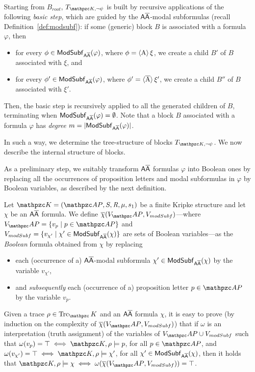 Starting from $B_{root}$,  $T_{\Ku,\neg\psi}$ is built by recursive applications of the following \emph{basic step}, 
which are guided
by the $\mathsf{A\overline{A}}$-modal subformulas (recall Definition~\ref{def:modsubf}):
%
if some (generic) block $B$ is associated with a formula $\varphi$, then
\begin{itemize}
	\item for every $\phi\in\mathsf{ModSubf}_{\mathsf{A\overline{A}}}(\varphi)$, where $\phi = \operatorname{\langle A\rangle} \xi$, we create a \forw{} child $B'$ of $B$ associated with $\xi$, and
	\item for every $\phi'\in\mathsf{ModSubf}_{\mathsf{A\overline{A}}}(\varphi)$, where $\phi' = \operatorname{\langle \overline{A}\rangle} \xi'$, we create a \back{} child $B''$ of $B$ associated with $\xi'$.
\end{itemize}
Then, the basic step is recursively applied to all the generated children of $B$, terminating when $\mathsf{ModSubf}_{\mathsf{A\overline{A}}}(\varphi)=\emptyset$.
Note that a block $B$ associated with a formula $\varphi$ has \emph{degree} $m=|\mathsf{ModSubf}_{\mathsf{A\overline{A}}}(\varphi)|$.

In such a way, we determine the 
tree-structure of blocks $T_{\Ku,\neg\psi}$. We now describe the internal structure of blocks. 

As a preliminary step, we suitably transform $\mathsf{A\overline{A}}$ formulas $\varphi$ into Boolean ones by replacing all the occurrences of proposition letters and modal subformulas in $\varphi$ by Boolean variables, as described by the next definition.

\begin{definition}\label{psioverl}
Let $\Ku=(\Prop,\States,\Edges,\Lab,s_1)$ be a finite Kripke structure and let $\chi$ be
an $\mathsf{A\overline{A}}$ formula. We define $\overline{\chi}(V_\Prop, V_{modSubf})$---where $V_\Prop=\{v_p\mid p\in\Prop\}$ and $V_{modSubf}=\{v_{\chi'}\mid\chi'\in\mathsf{ModSubf}_{\mathsf{A\overline{A}}}(\chi)\}$ are sets of Boolean variables---as the \emph{Boolean} formula obtained from $\chi$ by replacing
\begin{itemize}
	\item each (occurrence of a) $\mathsf{A\overline{A}}$-modal subformula $\chi'\in \mathsf{ModSubf}_{\mathsf{A\overline{A}}}(\chi)$ by the variable $v_{\chi'}$,
	\item and \emph{subsequently} each (occurrence of a) proposition letter $p\in\Prop$ by the variable $v_p$.
\end{itemize}
\end{definition}

Given a trace $\rho\in\Trk_\Ku$ and an $\mathsf{A\overline{A}}$ formula $\chi$,
it is easy to prove (by induction on the complexity of $\overline{\chi}(V_\Prop,V_{modSubf})$) that
if $\omega$ is an interpretation (truth assignment) of the variables of $V_\Prop\cup V_{modSubf}$ such that $\omega(v_p)=\top\iff \Ku,\rho\models p$, for all $p\in\Prop$, and $\omega(v_{\chi'})=\top\iff \Ku,\rho\models \chi'$, for all $\chi'\in\mathsf{ModSubf}_{\mathsf{A\overline{A}}}(\chi)$, then it holds that $\Ku,\rho\models \chi\iff\omega(\overline{\chi}(V_\Prop,V_{modSubf}))=\top$.

